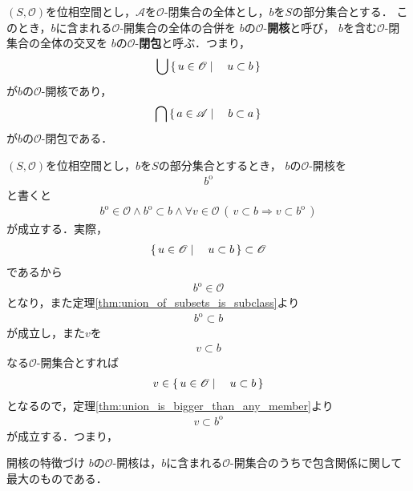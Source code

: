 	\begin{screen}
		\begin{dfn}[開核・閉包]
			$(S,\mathscr{O})$を位相空間とし，$\mathscr{A}$を$\mathscr{O}$-閉集合の全体とし，$b$を$S$の部分集合とする．
			このとき，$b$に含まれる$\mathscr{O}$-開集合の全体の合併を
			$b$の$\mathscr{O}$-{\bf 開核}と呼び，
			$b$を含む$\mathscr{O}$-閉集合の全体の交叉を
			$b$の$\mathscr{O}$-{\bf 閉包}と呼ぶ．つまり，
			\begin{align}
				\bigcup \left\{\, u \in \mathscr{O} \mid \quad u \subset b\, \right\}
			\end{align}
			が$b$の$\mathscr{O}$-開核であり，
			\begin{align}
				\bigcap \left\{\, a \in \mathscr{A} \mid \quad b \subset a\, \right\}
			\end{align}
			が$b$の$\mathscr{O}$-閉包である．
		\end{dfn}
	\end{screen}
	
	$(S,\mathscr{O})$を位相空間とし，$b$を$S$の部分集合とするとき，
	$b$の$\mathscr{O}$-開核を
	\begin{align}
		b^{\mathrm{o}}
	\end{align}
	と書くと
	\begin{align}
		b^{\mathrm{o}} \in \mathscr{O} \wedge b^{\mathrm{o}} \subset b \wedge 
		\forall v \in \mathscr{O}\, \left(\, v \subset b \Longrightarrow v \subset b^{\mathrm{o}}\, \right)
		\label{fom:interior_is_the_largest_open_subset}
	\end{align}
	が成立する．実際，
	\begin{align}
		\left\{\, u \in \mathscr{O} \mid \quad u \subset b\, \right\} \subset \mathscr{O}
	\end{align}
	であるから
	\begin{align}
		b^{\mathrm{o}} \in \mathscr{O}
	\end{align}
	となり，また定理\ref{thm:union_of_subsets_is_subclass}より
	\begin{align}
		b^{\mathrm{o}} \subset b
	\end{align}
	が成立し，また$v$を
	\begin{align}
		v \subset b
	\end{align}
	なる$\mathscr{O}$-開集合とすれば
	\begin{align}
		v \in \left\{\, u \in \mathscr{O} \mid \quad u \subset b\, \right\}
	\end{align}
	となるので，定理\ref{thm:union_is_bigger_than_any_member}より
	\begin{align}
		v \subset b^{\mathrm{o}}
	\end{align}
	が成立する．つまり，
	\begin{itembox}[l]{開核の特徴づけ}
		$b$の$\mathscr{O}$-開核は，$b$に含まれる$\mathscr{O}$-開集合のうちで包含関係に関して最大のものである．
	\end{itembox}
	
